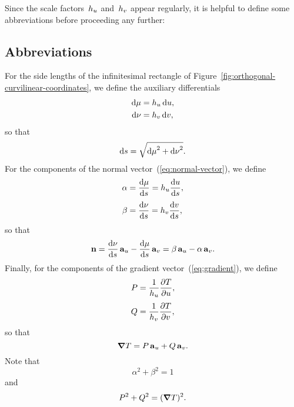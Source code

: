 Since the scale factors~$\scalefac[u]$ and~$\scalefac[v]$ appear regularly,
it is helpful to define some abbreviations
before proceeding any further:

\subsection{Abbreviations}
\label{sec:curvilinear.derivative.abbreviations}

For the side lengths of the infinitesimal rectangle
of Figure~\ref{fig:orthogonal-curvilinear-coordinates},
we define the auxiliary differentials
\begin{align}
  \td \mu &= \scalefac[u] \td u,
    \label{eq:differential-displacement-u-component} \\
  \td \nu &= \scalefac[v] \td v,
    \label{eq:differential-displacement-v-component}
\end{align}
so that
\begin{equation}
  \mathop{}\!\mathrm{d} s = \sqrt{{\mathop{}\!\mathrm{d} \mu}^2 + {\mathop{}\!\mathrm{d} \nu}^2}.
  \label{eq:differential-arc-length-abbreviated}
\end{equation}
For the components of the normal vector~(\ref{eq:normal-vector}),
we define
\begin{align}
  \alpha &= \tder{\mu}{s} = \scalefac[u] \tder{u}{s},
    \label{eq:tangent-u-component} \\[\tallspace]
  \beta &= \tder{\nu}{s} = \scalefac[v] \tder{v}{s},
    \label{eq:tangent-v-component}
\end{align}
so that
\begin{equation}
  \normalvec
    = \tder{\nu}{s} \basisvec{u} - \tder{\mu}{s} \basisvec{v}
    = \beta \basisvec{u} - \alpha \basisvec{v}.
  \label{eq:normal-vector-abbreviated}
\end{equation}
Finally, for the components of the gradient vector~(\ref{eq:gradient}),
we define
\begin{align}
  P &= \frac{1}{\scalefac[u]} \pder{T}{u},
    \label{eq:gradient-u-component} \\[\tallspace]
  Q &= \frac{1}{\scalefac[v]} \pder{T}{v},
    \label{eq:gradient-v-component}
\end{align}
so that
\begin{equation}
  \mathop{}\!\boldsymbol{\mathbf{\nabla}} T = P \mathop{}\!\boldsymbol{\mathbf{a}}_{u} + Q \mathop{}\!\boldsymbol{\mathbf{a}}_{v}.
  \label{eq:gradient-abbreviated}
\end{equation}
Note that
\begin{equation}
  \alpha^2 + \beta^2 = 1
  \label{eq:tangent-pythagoras}
\end{equation}
and
\begin{equation}
  P^2 + Q^2 = (\mathop{}\!\boldsymbol{\mathbf{\nabla}} T)^2.
  \label{eq:gradient-pythagoras}
\end{equation}

